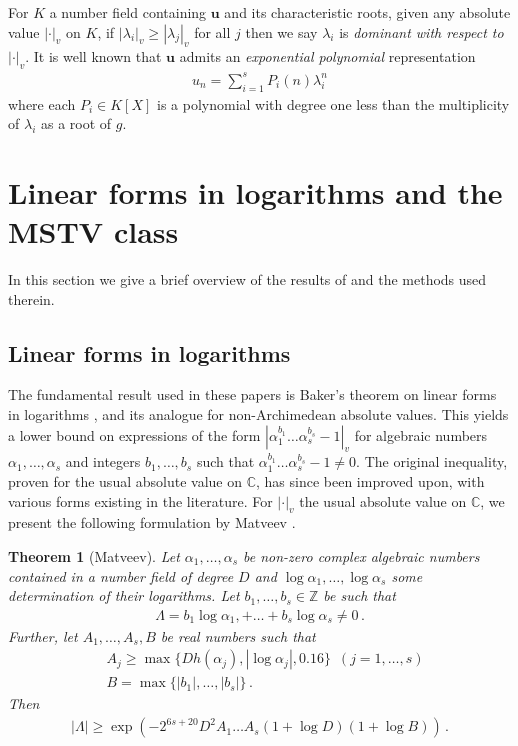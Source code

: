 \documentclass{article}\usepackage[a4paper,margin=20mm]{geometry}
\newtheorem{theorem}{Theorem}\newtheorem{lemma}[theorem]{Lemma}\newtheorem{proposition}[theorem]{Proposition}\newtheorem{corollary}[theorem]{Corollary}\newtheorem{definition}[theorem]{Definition}\newtheorem{claim}[theorem]{Claim}\newtheorem{remark}[theorem]{Remark}\newtheorem{observation}[theorem]{Observation}\newtheorem{conjecture}[theorem]{Conjecture}\newtheorem{example}[theorem]{Example}
\newcommand{\Z}{\mathbb{Z}}
\newcommand{\LRS}[1]{{\bm{#1}}}
\begin{document}
 For $K$ a number field containing $\LRS{u}$ and its characteristic roots, given any absolute value $|\cdot|_v$ on $K$, if $|\lambda_i|_v \geq |\lambda_j|_v$ for all $j$ then we say $\lambda_i$ is \emph{dominant with respect to} $|\cdot|_v$. It is well known that $\LRS{u}$ admits an \emph{exponential polynomial} representation
 \begin{align*}
     u_n = \sum_{i=1}^s P_i(n) \lambda_i^n
 \end{align*}
 where each $P_i \in K[X]$ is a polynomial with degree one less than the multiplicity of $\lambda_i$ as a root of $g$.
\section{Linear forms in logarithms and the MSTV class} 
In this section we give a brief overview of the results of \cite{Mignotte_distance,Vereshchagin} and the methods used therein. 
\subsection{Linear forms in logarithms}
The fundamental result used in these papers is Baker's theorem on linear forms in logarithms \cite{Baker_Sharpening_II_1973}, and its analogue for non-Archimedean absolute values. This yields a lower bound on expressions of the form $|\alpha_1^{b_1} \dots \alpha_s^{b_s}-1|_v$ for algebraic numbers $\alpha_1, \dots , \alpha_s$ and integers $b_1, \dots , b_s$ such that $\alpha_1^{b_1} \dots  \alpha_s^{b_s} - 1 \neq 0$. The original inequality, proven for the usual absolute value on $\mathbb C$, has since been improved upon, with various forms existing in the literature. For $|\cdot|_v$ the usual absolute value on $\mathbb C$, we present the following formulation by Matveev \cite[Corollary 2.3]{matveev_explicit_2000}.
\begin{theorem}[Matveev]\label{Matveev} Let $\alpha_1, \dots , \alpha_s$ be non-zero complex algebraic numbers contained in a number field of degree $D$ and $\log \alpha_1, \dots , \log \alpha_s$ some determination of their logarithms. Let $b_1, \dots , b_s \in \Z$ be such that 
\begin{align*}
    \Lambda = b_1 \log \alpha_1, + \dots + b_s \log \alpha_s \neq 0 \, .
\end{align*}
Further, let $A_1, \dots , A_s, B$ be real numbers such that 
\begin{align*}
    &A_j \geq \max\{Dh(\alpha_j), |\log \alpha_j|, 0.16\} \, \, \, (j = 1, \dots , s) \\
    &B = \max\{|b_1|, \dots , |b_s|\} \, .
\end{align*}
Then 
\begin{align*}
    |\Lambda| \geq \exp\left(-2^{6s+20}D^2 A_1 \dots A_s (1+ \log D)(1+ \log B)\right) \, .
\end{align*}
\end{theorem}
\end{document}
